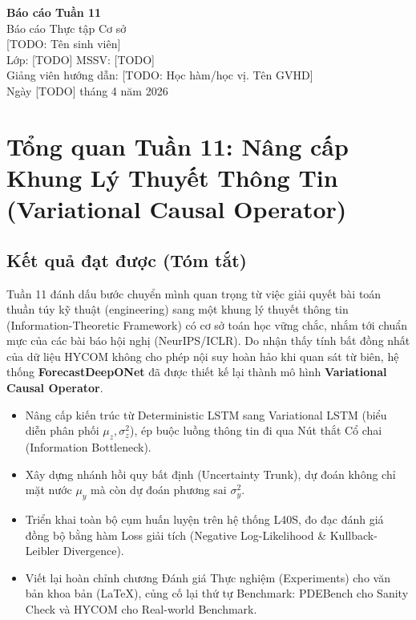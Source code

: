 \documentclass[12pt,a4paper]{article}
\begin{document}
\begin{center}
  {\LARGE\bfseries Báo cáo Tuần 11}\\[4pt]
  {\large Báo cáo Thực tập Cơ sở}\\[12pt]
  [TODO: Tên sinh viên]\\
  Lớp: [TODO] \quad MSSV: [TODO]\\
  Giảng viên hướng dẫn: [TODO: Học hàm/học vị. Tên GVHD]\\[4pt]
  Ngày [TODO] tháng 4 năm 2026
\end{center}

\vspace{1em}

\section{Tổng quan Tuần 11: Nâng cấp Khung Lý Thuyết Thông Tin (Variational Causal Operator)}

\subsection{Kết quả đạt được (Tóm tắt)}

Tuần 11 đánh dấu bước chuyển mình quan trọng từ việc giải quyết bài toán thuần túy kỹ thuật (engineering) sang một khung lý thuyết thông tin (Information-Theoretic Framework) có cơ sở toán học vững chắc, nhắm tới chuẩn mực của các bài báo hội nghị (NeurIPS/ICLR). Do nhận thấy tính bất đồng nhất của dữ liệu HYCOM không cho phép nội suy hoàn hảo khi quan sát từ biên, hệ thống \textbf{ForecastDeepONet} đã được thiết kế lại thành mô hình \textbf{Variational Causal Operator}.

\begin{itemize}[nosep]
  \item Nâng cấp kiến trúc từ Deterministic LSTM sang Variational LSTM (biểu diễn phân phối $\mu_z, \sigma_z^2$), ép buộc luồng thông tin đi qua Nút thắt Cổ chai (Information Bottleneck).
  \item Xây dựng nhánh hồi quy bất định (Uncertainty Trunk), dự đoán không chỉ mặt nước $\mu_y$ mà còn dự đoán phương sai $\sigma_y^2$.
  \item Triển khai toàn bộ cụm huấn luyện trên hệ thống L40S, đo đạc đánh giá đồng bộ bằng hàm Loss giải tích (Negative Log-Likelihood \& Kullback-Leibler Divergence).
  \item Viết lại hoàn chỉnh chương Đánh giá Thực nghiệm (Experiments) cho văn bản khoa bản (LaTeX), củng cố lại thứ tự Benchmark: PDEBench cho Sanity Check và HYCOM cho Real-world Benchmark.
\end{itemize}
\end{document}
